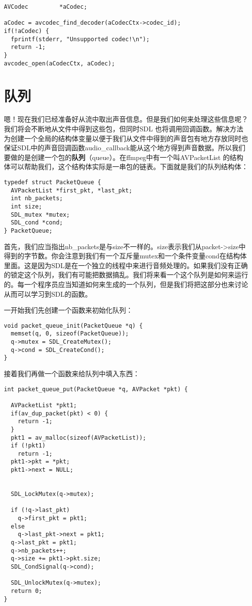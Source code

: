 \begin{lstlisting}
AVCodec         *aCodec;

aCodec = avcodec_find_decoder(aCodecCtx->codec_id);
if(!aCodec) {
  fprintf(stderr, "Unsupported codec!\n");
  return -1;
}
avcodec_open(aCodecCtx, aCodec);
\end{lstlisting}
\section{队列}

嗯！现在我们已经准备好从流中取出声音信息。但是我们如何来处理这些信息呢？我们将会不断地从文件中得到这些包，但同时SDL 也将调用回调函数。解决方法为创建一个全局的结构体变量以便于我们从文件中得到的声音包有地方存放同时也保证SDL中的声音回调函数audio_callback能从这个地方得到声音数据。所以我们要做的是创建一个包的\textbf{队列}（queue）。在ffmpeg中有一个叫AVPacketList 的结构体可以帮助我们，这个结构体实际是一串包的链表。下面就是我们的队列结构体：

\begin{lstlisting}
typedef struct PacketQueue {
  AVPacketList *first_pkt, *last_pkt;
  int nb_packets;
  int size;
  SDL_mutex *mutex;
  SDL_cond *cond;
} PacketQueue;
\end{lstlisting}

首先，我们应当指出nb_packets是与size不一样的。size表示我们从packet->size中得到的字节数。你会注意到我们有一个互斥量mutex和一个条件变量cond在结构体里面。这是因为SDL是在一个独立的线程中来进行音频处理的。如果我们没有正确的锁定这个队列，我们有可能把数据搞乱。我们将来看一个这个队列是如何来运行的。每一个程序员应当知道如何来生成的一个队列，但是我们将把这部分也来讨论从而可以学习到SDL的函数。

一开始我们先创建一个函数来初始化队列：
\begin{lstlisting}
void packet_queue_init(PacketQueue *q) {
  memset(q, 0, sizeof(PacketQueue));
  q->mutex = SDL_CreateMutex();
  q->cond = SDL_CreateCond();
}
\end{lstlisting}

接着我们再做一个函数来给队列中填入东西：
\begin{lstlisting}
int packet_queue_put(PacketQueue *q, AVPacket *pkt) {

  AVPacketList *pkt1;
  if(av_dup_packet(pkt) < 0) {
    return -1;
  }
  pkt1 = av_malloc(sizeof(AVPacketList));
  if (!pkt1)
    return -1;
  pkt1->pkt = *pkt;
  pkt1->next = NULL;


  SDL_LockMutex(q->mutex);

  if (!q->last_pkt)
    q->first_pkt = pkt1;
  else
    q->last_pkt->next = pkt1;
  q->last_pkt = pkt1;
  q->nb_packets++;
  q->size += pkt1->pkt.size;
  SDL_CondSignal(q->cond);

  SDL_UnlockMutex(q->mutex);
  return 0;
}
\end{lstlisting}

